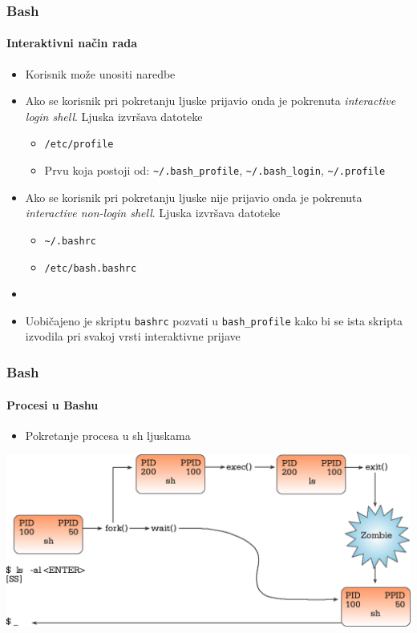 \documentclass[table,usenames,dvipsnames]{beamer}
\newcommand{\shell}[1]{\texttt{#1}}
\begin{document}
\begin{frame}[t]
	\frametitle{Bash}
	\framesubtitle{Interaktivni način rada}
	\begin{itemize}
		\item Korisnik može unositi naredbe
		\item Ako se korisnik pri pokretanju ljuske prijavio onda je pokrenuta \emph{interactive login shell}. Ljuska izvršava datoteke
		\begin{itemize}
			\item \shell{/etc/profile}
			\item Prvu koja postoji od: \shell{\~{}/.bash\_profile}, \shell{\~{}/.bash\_login}, 
			\shell{\~{}/.profile}
		\end{itemize}
		\item Ako se korisnik pri pokretanju ljuske nije prijavio onda je pokrenuta \emph{interactive non-login shell}. Ljuska izvršava datoteke
		\begin{itemize}
			\item \shell{\~{}/.bashrc}
			\item \shell{/etc/bash.bashrc}
		\end{itemize}
		\item[]
		\item Uobičajeno je skriptu \shell{bashrc} pozvati u \shell{bash\_profile} kako bi se ista skripta izvodila pri svakoj vrsti interaktivne prijave
	\end{itemize}
\end{frame}

\begin{frame}[t]
	\frametitle{Bash}
	\framesubtitle{Procesi u Bashu}
	\begin{itemize}
		\item Pokretanje procesa u sh ljuskama
	\end{itemize}
	\includegraphics[width=\linewidth]{process_start}
\end{frame}
\end{document}
